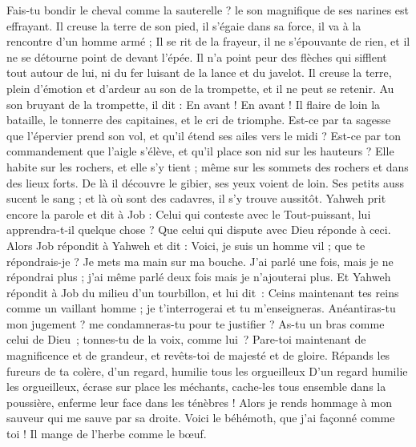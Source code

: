 \begin{multicols}{2}
Fais-tu bondir le cheval comme la sauterelle ? le son magnifique de ses narines est effrayant.
Il creuse la terre de son pied, il s'égaie dans sa force, il va à la rencontre d'un homme armé ;
Il se rit de la frayeur, il ne s'épouvante de rien, et il ne se détourne point de devant l'épée.
Il n'a point peur des flèches qui sifflent tout autour de lui, ni du fer luisant de la lance et du javelot. 
Il creuse la terre, plein d'émotion et d'ardeur au son de la trompette, et il ne peut se retenir. 
Au son bruyant de la trompette, il dit : En avant ! En avant ! Il flaire de loin la bataille, le tonnerre des capitaines, et le cri de triomphe.
Est-ce par ta sagesse que l'épervier prend son vol, et qu'il étend ses ailes vers le midi ?
Est-ce par ton commandement que l'aigle s'élève, et qu'il place son nid sur les hauteurs ?
Elle habite sur les rochers, et elle s'y tient ; même sur les sommets des rochers et dans des lieux forts. 
De là il découvre le gibier, ses yeux voient de loin.
Ses petits auss sucent le sang ; et là où sont des cadavres, il s'y trouve aussitôt.
Yahweh prit encore la parole et dit à Job :
Celui qui conteste avec le Tout-puissant, lui apprendra-t-il quelque chose ? Que celui qui dispute avec Dieu réponde à ceci.
Alors Job répondit à Yahweh et dit :
Voici, je suis un homme vil ; que te répondrais-je ? Je mets ma main sur ma bouche.
J'ai parlé une fois, mais je ne répondrai plus ; j'ai même parlé deux fois mais je n'ajouterai plus.
\VerseOne{}Et Yahweh répondit à Job du milieu d'un tourbillon, et lui dit :
Ceins maintenant tes reins comme un vaillant homme ; je t'interrogerai et tu m'enseigneras.
Anéantiras-tu mon jugement ? me condamneras-tu pour te justifier ?
As-tu un bras comme celui de Dieu ; tonnes-tu de la voix, comme lui ?
Pare-toi maintenant de magnificence et de grandeur, et revêts-toi de majesté et de gloire.
Répands les fureurs de ta colère, d'un regard, humilie tous les orgueilleux
D'un regard humilie les orgueilleux, écrase sur place les méchants,
cache-les tous ensemble dans la poussière, enferme leur face dans les ténèbres !
Alors je rends hommage à mon sauveur qui me sauve par sa droite.
Voici le béhémoth, que j'ai façonné comme toi ! Il mange de l'herbe comme le bœuf.

\end{multicols}
